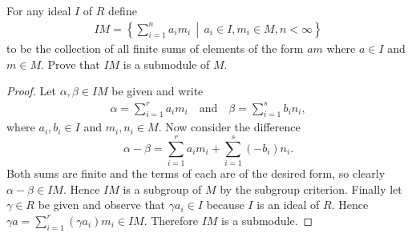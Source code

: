 \documentclass[10pt]{amsart}
\begin{document}
\begin{thm}
  \label{Ex2}
  For any ideal $I$ of $R$ define
  \begin{align*}
    IM = \left\{ \sum_{i=1}^n a_im_i \,\middle\vert\, a_i \in I, m_i \in M, n < \infty \right\}
  \end{align*}
  to be the collection of all finite sums of elements of the form $am$ where $a\in I$ and $m\in M$.  Prove that $IM$ is a submodule of $M$.
  \begin{proof}
    Let $\alpha,\beta \in IM$ be given and write 
    \begin{align*}
      {\alpha = \sum_{i=1}^r a_im_i} \quad \text{and} \quad {\beta = \sum_{i = 1}^s b_in_i},
    \end{align*}
    where $a_i,b_i \in I$ and $m_i,n_i \in M$.
    Now consider the difference 
    $$\alpha - \beta = {\sum_{i=1}^r a_im_i} + {\sum_{i = 1}^s (-b_i)n_i}.$$
    Both sums are finite and the terms of each are of the desired form, so clearly $\alpha - \beta \in IM$.
    Hence $IM$ is a subgroup of $M$ by the subgroup criterion.
    Finally let $\gamma \in R$ be given and observe that $\gamma a_i \in I$ because $I$ is an ideal of $R$.  
    Hence $\gamma a = \sum_{i=1}^r (\gamma a_i)m_i \in IM$.
    Therefore $IM$ is a submodule.
  \end{proof}
\end{thm}
\end{document}
